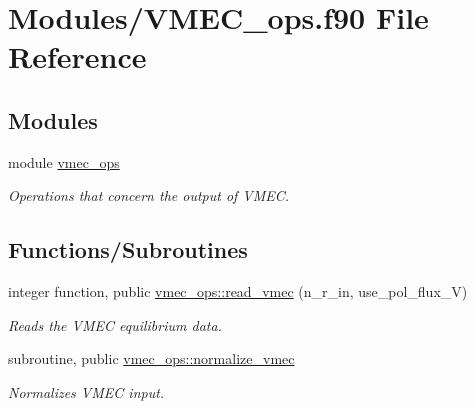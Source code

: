 \hypertarget{VMEC__ops_8f90}{}\section{Modules/\+V\+M\+E\+C\+\_\+ops.f90 File Reference}
\label{VMEC__ops_8f90}
\subsection*{Modules}
\begin{DoxyCompactItemize}
\item 
module \hyperlink{namespacevmec__ops}{vmec\+\_\+ops}
\begin{DoxyCompactList}\small\item\em Operations that concern the output of V\+M\+EC. \end{DoxyCompactList}\end{DoxyCompactItemize}
\subsection*{Functions/\+Subroutines}
\begin{DoxyCompactItemize}
\item 
integer function, public \hyperlink{namespacevmec__ops_a5afb9dedf9ef3dc2b4d93e20de2e22b8}{vmec\+\_\+ops\+::read\+\_\+vmec} (n\+\_\+r\+\_\+in, use\+\_\+pol\+\_\+flux\+\_\+V)
\begin{DoxyCompactList}\small\item\em Reads the V\+M\+EC equilibrium data. \end{DoxyCompactList}\item 
subroutine, public \hyperlink{namespacevmec__ops_a95f04a642fd732a538aef30052a12863}{vmec\+\_\+ops\+::normalize\+\_\+vmec}
\begin{DoxyCompactList}\small\item\em Normalizes V\+M\+EC input. \end{DoxyCompactList}\end{DoxyCompactItemize}
